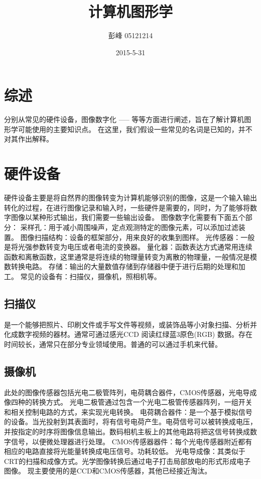 \documentclass[UTF8]{article}
\begin{document}
 
\author{    彭峰     05121214   }
 \date{2015-5-31}
\title{计算机图形学}  %
\titlelabel{\S\thetitle\quad}
\maketitle%


\section{综述}
分别从常见的硬件设备，图像数字化   -----  等等方面进行阐述，旨在了解计算机图形学可能使用的主要知识点。
在这里，我们假设一些常见的名词是已知的，并不对其作出解释。
\section{硬件设备}
硬件设备主要是将自然界的图像转变为计算机能够识别的图像，这是一个输入输出转化的过程，在进行图像记录和输入时，一些硬件是需要的，同时，为了能够将数字图像以某种形式输出，我们需要一些输出设备。
图像数字化需要有下面五个部分：
采样孔：用于减小周围噪声，定点观测特定的图像元素，可以添加过滤装置。
图像扫描结构：设备的框架部分，用来良好的收集到图样。
光传感器：一般是将光强参数转变为电压或者电流的变换器。
量化器：函数表达方式通常用连续函数和离散函数，这里通常是将连续的物理量转变为离散的物理量，一般情况是模数转换电路。
存储：输出的大量数值存储到存储器中便于进行后期的处理和加工。
常见的设备有：扫描仪，摄像机，照相机等。


\subsection{扫描仪}
是一个能够把照片、印刷文件或手写文件等视频，或装饰品等小对象扫描、分析并化成数字视频的器材。通常可通过感光CCD 阅读红绿蓝3原色(RGB) 数据。存在时间较长，通常只在部分专业领域使用。普通的可以通过手机来代替。
\subsection{摄像机}
此处的图像传感器包括光电二极管阵列，电荷耦合器件，CMOS传感器，光电导成像四种的转换方式。
光电二极管通过包含一个光电二极管传感器阵列，一组开关和相关控制电路的方式，来实现光电转换。
电荷耦合器件：是一个基于模拟信号的设备。当光投射到其表面时，将有信号电荷产生。电荷信号可以被转换成电压，并按指定的时序将图像信息输出。数码相机主板上的其他电路将把这信号转换成数字信号，以便微处理器进行处理。
CMOS传感器器件：每个光电传感器附近都有相应的电路直接将光能量转换成电压信号。功耗较低。
光电导成像：其类似于CRT的扫描和成像方式。光学图像转换后通过电子打击局部放电的形式形成电子图像。
现主要使用的是CCD和CMOS传感器，其他已经接近淘汰。
\end{document}
